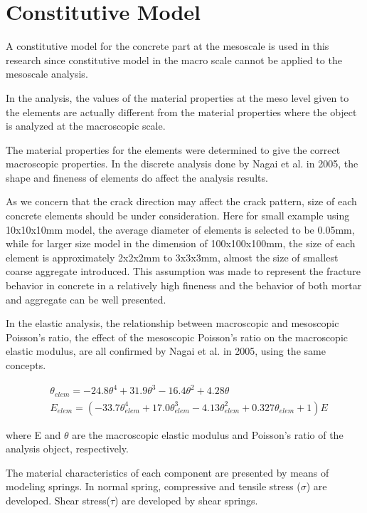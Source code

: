 \section{Constitutive Model}

A constitutive model for the concrete part at the mesoscale is used in this research since constitutive model in the macro scale cannot be applied to the mesoscale analysis.

In the analysis, the values of the material properties at the meso level given to the elements are actually different from the material properties where the object is analyzed at the macroscopic scale.

The material properties for the elements were determined to give the correct macroscopic properties.  In the discrete analysis done by Nagai et al. in 2005, the shape and fineness of elements do affect the analysis results.

As we concern that the crack direction may affect the crack pattern, size of each concrete elements should be under consideration. Here for small example using 10x10x10mm model, the average diameter of elements is selected to be 0.05mm, while for larger size model in the dimension of 100x100x100mm, the size of each element is approximately 2x2x2mm to 3x3x3mm, almost the size of smallest coarse aggregate introduced. This assumption was made to represent the fracture behavior in concrete in a relatively high fineness and the behavior of both mortar and aggregate can be well presented.

In the elastic analysis, the relationship between macroscopic and mesoscopic Poisson's ratio, the effect of the mesoscopic Poisson's ratio on the macroscopic elastic modulus, are all confirmed by Nagai et al. in 2005, using the same concepts.

\begin{equation}
  \begin{aligned}
  &\theta_{elem} = -24.8\theta^4+31.9\theta^3-16.4\theta^2 +4.28\theta\\
  &E_{elem} = (-33.7\theta_{elem}^4 + 17.0\theta_{elem}^3 - 4.13\theta_{elem}^2 + 0.327\theta_{elem} + 1)E
  \end{aligned}
\end{equation}

where E and $\theta$ are the macroscopic elastic modulus and Poisson's ratio of the analysis object, respectively.

The material characteristics of each component are presented by means of modeling springs. In normal spring, compressive and tensile stress ($\sigma$) are developed. Shear stress($\tau$) are developed by shear springs.

